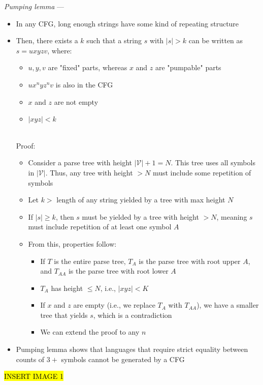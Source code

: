 \emph{Pumping lemma} ---
\begin{itemize}
    \item In any CFG, long enough strings have some kind of repeating structure
    \item Then, there exists a $k$ such that a string $s$ with $|s| > k$ can be written as $s = u x y z v$, where:
    \begin{itemize}
        \item $u, y, v$ are "fixed" parts, whereas $x$ and $z$ are "pumpable" parts
        \item $u x^n y z^n v$ is also in the CFG
        \item $x$ and $z$ are not empty
        \item $|x y z| < k$
    \end{itemize}\\
    Proof:
    \begin{itemize}
        \item Consider a parse tree with height $|\mathcal{V}| + 1 = N$. This tree uses all symbols in $|\mathcal{V}|$. Thus, any tree with height $> N$ must include some repetition of symbols
        \item Let $k >$ length of any string yielded by a tree with max height $N$
        \item If $|s| \geq k$, then $s$ must be yielded by a tree with height $> N$, meaning $s$ must include repetition of at least one symbol $A$
        \item From this, properties follow:
        \begin{itemize}
            \item If $T$ is the entire parse tree, $T_A$ is the parse tree with root upper $A$, and $T_{AA}$ is the parse tree with root lower $A$
            \item $T_A$ has height $\leq N$, i.e., $|xyz| < K$
            \item If $x$ and $z$ are empty (i.e., we replace $T_A$ with $T_{AA}$), we have a smaller tree that yields $s$, which is a contradiction
            \item We can extend the proof to any $n$
        \end{itemize}
    \end{itemize}
    \item Pumping lemma shows that languages that require strict equality between counts of $3+$ symbols cannot be generated by a CFG
\end{itemize}
\hl{INSERT IMAGE 1}

